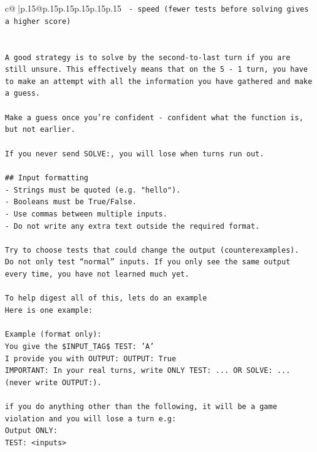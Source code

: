 \documentclass{article}
\begin{document}
{\begin{supertabular}{c@{$\;$}|p{.15\linewidth}@{}p{.15\linewidth}p{.15\linewidth}p{.15\linewidth}p{.15\linewidth}p{.15\linewidth}}
{{{\texttt{		{-} speed (fewer tests before solving gives a higher score)} \\
\\ 
\\ 
\texttt{A good strategy is to solve by the second{-}to{-}last turn if you are still unsure. This effectively means that on the 5 {-} 1 turn, you have to make an attempt with all the information you have gathered and make a guess.} \\
\\ 
\texttt{Make a guess once you're confident {-} confident what the function is, but not earlier.} \\
\\ 
\texttt{If you never send SOLVE:, you will lose when turns run out.} \\
\\ 
\texttt{\#\# Input formatting} \\
\texttt{{-} Strings must be quoted (e.g. "hello").} \\
\texttt{{-} Booleans must be True/False.} \\
\texttt{{-} Use commas between multiple inputs.} \\
\texttt{{-} Do not write any extra text outside the required format.} \\
\\ 
\texttt{Try to choose tests that could change the output (counterexamples).} \\
\texttt{Do not only test “normal” inputs. If you only see the same output every time, you have not learned much yet.} \\
\\ 
\texttt{To help digest all of this, lets do an example} \\
\texttt{Here is one example:} \\
\\ 
\texttt{Example (format only):} \\
\texttt{You give the \$INPUT\_TAG\$ TEST: 'A'} \\
\texttt{I provide you with OUTPUT: OUTPUT: True} \\
\texttt{IMPORTANT: In your real turns, write ONLY TEST: ... OR SOLVE: ... (never write OUTPUT:).} \\
\\ 
\texttt{if you do anything other than the following, it will be a game violation and you will lose a turn e.g:} \\
\texttt{Output ONLY:} \\
\texttt{TEST: <inputs>} \\
}}}
\end{supertabular}}
\end{document}
